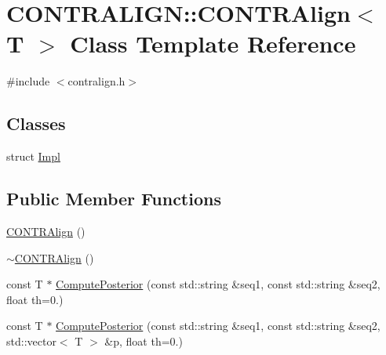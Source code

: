 \hypertarget{class_c_o_n_t_r_a_l_i_g_n_1_1_c_o_n_t_r_align}{\section{C\+O\+N\+T\+R\+A\+L\+I\+G\+N\+:\+:C\+O\+N\+T\+R\+Align$<$ T $>$ Class Template Reference}
\label{class_c_o_n_t_r_a_l_i_g_n_1_1_c_o_n_t_r_align}
}


{\ttfamily \#include $<$contralign.\+h$>$}

\subsection*{Classes}
\begin{DoxyCompactItemize}
\item 
struct \hyperlink{struct_c_o_n_t_r_a_l_i_g_n_1_1_c_o_n_t_r_align_1_1_impl}{Impl}
\end{DoxyCompactItemize}
\subsection*{Public Member Functions}
\begin{DoxyCompactItemize}
\item 
\hyperlink{class_c_o_n_t_r_a_l_i_g_n_1_1_c_o_n_t_r_align_a0323bb64e04f9c29265eb4301f3e0957}{C\+O\+N\+T\+R\+Align} ()
\item 
\hyperlink{class_c_o_n_t_r_a_l_i_g_n_1_1_c_o_n_t_r_align_a5e54e0ccf359bb11aa187b6c0e25f76c}{$\sim$\+C\+O\+N\+T\+R\+Align} ()
\item 
const T $\ast$ \hyperlink{class_c_o_n_t_r_a_l_i_g_n_1_1_c_o_n_t_r_align_a8ec224357474168884cf0bebd0ac2ea7}{Compute\+Posterior} (const std\+::string \&seq1, const std\+::string \&seq2, float th=0.)
\item 
const T $\ast$ \hyperlink{class_c_o_n_t_r_a_l_i_g_n_1_1_c_o_n_t_r_align_af353728417b9a1235310da06ac137742}{Compute\+Posterior} (const std\+::string \&seq1, const std\+::string \&seq2, std\+::vector$<$ T $>$ \&p, float th=0.)
\end{DoxyCompactItemize}


